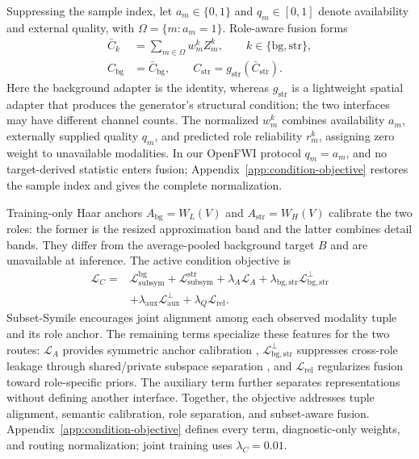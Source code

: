 Suppressing the sample index, let $a_m\in\{0,1\}$ and $q_m\in[0,1]$ denote availability and external quality, with $\Omega=\{m:a_m=1\}$. Role-aware fusion forms
\begin{align}
\bar C_k
&=\sum_{m\in\Omega}w_m^k Z_m^k,
\qquad k\in\{\mathrm{bg},\mathrm{str}\},\nonumber\\
C_{\mathrm{bg}}&=\bar C_{\mathrm{bg}},\qquad
C_{\mathrm{str}}=g_{\mathrm{str}}(\bar C_{\mathrm{str}}).
\label{eq:reliability-fusion}
\end{align}
Here the background adapter is the identity, whereas $g_{\mathrm{str}}$ is a lightweight spatial adapter that produces the generator's structural condition; the two interfaces may have different channel counts. The normalized $w_m^k$ combines availability $a_m$, externally supplied quality $q_m$, and predicted role reliability $r_m^k$, assigning zero weight to unavailable modalities. In our OpenFWI protocol $q_m=a_m$, and no target-derived statistic enters fusion; Appendix~\ref{app:condition-objective} restores the sample index and gives the complete normalization.

Training-only Haar anchors $A_{\mathrm{bg}}=W_L(V)$ and $A_{\mathrm{str}}=W_H(V)$ \cite{mallat1989theory} calibrate the two roles: the former is the resized approximation band and the latter combines detail bands. They differ from the average-pooled background target $B$ and are unavailable at inference. The active condition objective is
\begin{align}
\mathcal L_C
={}&\mathcal L_{\mathrm{subsym}}^{\mathrm{bg}}
 +\mathcal L_{\mathrm{subsym}}^{\mathrm{str}}+\lambda_A\mathcal L_A
 +\lambda_{\mathrm{bg,str}}\mathcal L_{\mathrm{bg,str}}^{\perp}
\nonumber\\
&+\lambda_{\mathrm{aux}}\mathcal L_{\mathrm{aux}}^{\perp}
 +\lambda_Q\mathcal L_{\mathrm{rel}}.
\label{eq:condition-loss}
\end{align}
Subset-Symile \cite{saporta2024symile} encourages joint alignment among each observed modality tuple and its role anchor. The remaining terms specialize these features for the two routes: $\mathcal L_A$ provides symmetric anchor calibration \cite{chen2020simclr}, $\mathcal L_{\mathrm{bg,str}}^{\perp}$ suppresses cross-role leakage through shared/private subspace separation \cite{bousmalis2016domain}, and $\mathcal L_{\mathrm{rel}}$ regularizes fusion toward role-specific priors. The auxiliary term further separates representations without defining another interface. Together, the objective addresses tuple alignment, semantic calibration, role separation, and subset-aware fusion. Appendix~\ref{app:condition-objective} defines every term, diagnostic-only weights, and routing normalization; joint training uses $\lambda_C=0.01$.


